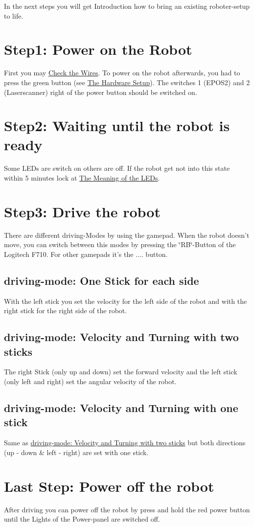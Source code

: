In the next steps you will get Introduction how to bring an existing roboter-\/setup to life.\hypertarget{start_start_step1}{}\section{Step1\-: Power on the Robot}\label{start_start_step1}
First you may \hyperlink{troubleshooting_checkWires}{Check the Wires}. To power on the robot afterwards, you had to press the green button (see \hyperlink{index_hw_setup}{The Hardware Setup}). The switches 1 (E\-P\-O\-S2) and 2 (Laserscanner) right of the power button should be switched on.\hypertarget{start_start_step2}{}\section{Step2\-: Waiting until the robot is ready}\label{start_start_step2}
Some L\-E\-Ds are switch on others are off. If the robot get not into this state within 5 minutes lock at \hyperlink{troubleshooting_checkLEDs}{The Meaning of the L\-E\-Ds}.\hypertarget{start_start_step3}{}\section{Step3\-: Drive the robot}\label{start_start_step3}
There are different driving-\/\-Modes by using the gamepad. When the robot doesn't move, you can switch between this modes by pressing the \char`\"{}\-R\-B\char`\"{}-\/\-Button of the Logitech F710. For other gamepads it's the .... button.\hypertarget{start_mode_tank}{}\subsection{driving-\/mode\-: One Stick for each side}\label{start_mode_tank}
With the left stick you set the velocity for the left side of the robot and with the right stick for the right side of the robot.\hypertarget{start_mode_twostick}{}\subsection{driving-\/mode\-: Velocity and Turning with two sticks}\label{start_mode_twostick}
The right Stick (only up and down) set the forward velocity and the left stick (only left and right) set the angular velocity of the robot.\hypertarget{start_mode_onestick}{}\subsection{driving-\/mode\-: Velocity and Turning with one stick}\label{start_mode_onestick}
Same as \hyperlink{start_mode_twostick}{driving-\/mode\-: Velocity and Turning with two sticks} but both directions (up -\/ down \& left -\/ right) are set with one stick.\hypertarget{start_power_off}{}\section{Last Step\-: Power off the robot}\label{start_power_off}
After driving you can power off the robot by press and hold the red power button until the Lights of the Power-\/panel are switched off. 